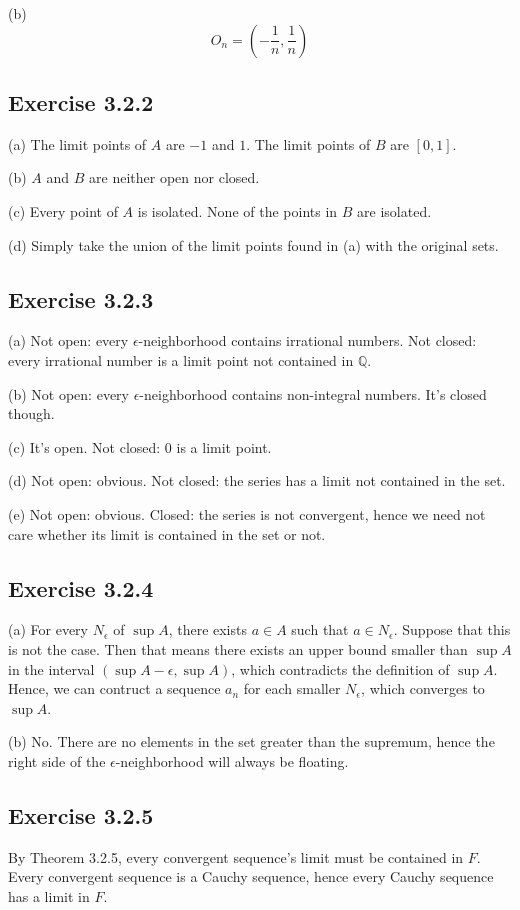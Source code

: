 \documentclass{book}
\begin{document}
\noindent
(b)
$$O_n = \left( -\frac{1}{n}, \frac{1}{n} \right)$$

\subsection*{Exercise 3.2.2}
(a)
The limit points of $A$ are $-1$ and $1$. The limit points of $B$ are $[0, 1]$.

\noindent
(b)
$A$ and $B$ are neither open nor closed.

\noindent
(c)
Every point of $A$ is isolated. None of the points in $B$ are isolated.

\noindent
(d)
Simply take the union of the limit points found in (a) with the original sets.

\subsection*{Exercise 3.2.3}
(a)
Not open: every $\epsilon$-neighborhood contains irrational numbers. Not closed: every irrational number is a limit point not contained in $\mathbb{Q}$.

\noindent
(b)
Not open: every $\epsilon$-neighborhood contains non-integral numbers. It's closed though.

\noindent
(c)
It's open. Not closed: $0$ is a limit point.

\noindent
(d)
Not open: obvious. Not closed: the series has a limit not contained in the set.

\noindent
(e)
Not open: obvious. Closed: the series is not convergent, hence we need not care whether its limit is contained in the set or not.

\subsection*{Exercise 3.2.4}
(a)
For every $N_\epsilon$ of $\sup A$, there exists $a \in A$ such that $a \in N_\epsilon$. Suppose that this is not the case. Then that means there exists an upper bound smaller than $\sup A$ in the interval $(\sup A - \epsilon, \sup A)$, which contradicts the definition of $\sup A$. Hence, we can contruct a sequence $a_n$ for each smaller $N_\epsilon$, which converges to $\sup A$.

\noindent
(b)
No. There are no elements in the set greater than the supremum, hence the right side of the $\epsilon$-neighborhood will always be floating.

\subsection*{Exercise 3.2.5}
By Theorem 3.2.5, every convergent sequence's limit must be contained in $F$. Every convergent sequence is a Cauchy sequence, hence every Cauchy sequence has a limit in $F$.
\end{document}

